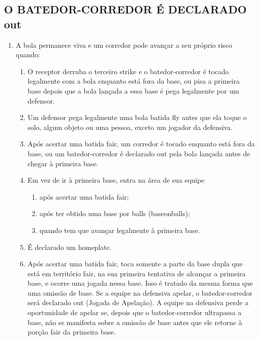 \vspace{5mm}
\subsection{O BATEDOR-CORREDOR \'E DECLARADO \gls{out}} 
\begin{multicols}{2}
	\begin{enumerate}[label=\alph*)]
		\item A bola permanece viva e um corredor pode avan\c{c}ar a seu pr\'oprio risco quando: 
		
		\begin{enumerate}[label=\roman*.]
			\item O receptor derruba o terceiro \gls{strike} e o batedor-corredor \'e tocado legalmente com a bola enquanto est\'a fora da base, ou pisa a primeira base 
			depois que a bola lan\c{c}ada a essa base \'e pega legalmente por um defensor. 
			\item Um defensor pega legalmente uma bola batida \gls{fly} antes que ela toque o solo, algum objeto ou uma pessoa, exceto um jogador da defensiva. 
			\item Ap\'os acertar uma batida \gls{fair}, um corredor \'e tocado enquanto est\'a fora da base, ou um batedor-corredor \'e declarado \gls{out} pela bola lan\c{c}ada antes de chegar \`a primeira base. 
			\item Em vez de ir \`a primeira base, entra na \'area de sua equipe 
			\begin{enumerate}[label=\arabic*)]
				\item ap\'os acertar uma batida \gls{fair}; 
				\item ap\'os ter obtido uma base por \glspl{ball} (\gls{baseonballs}); 
				\item quando tem que avan\c{c}ar legalmente \`a primeira base. 
			\end{enumerate}
			\item \'E declarado um \gls{homeplate}. 
			\item Ap\'os acertar uma batida \gls{fair}, toca somente a parte da base dupla que est\'a em territ\'orio \gls{fair}, na sua primeira tentativa de alcan\c{c}ar a primeira base, e ocorre uma jogada nessa base. Isso \'e tratado da mesma forma que uma omiss\~ao de base. Se a equipe na defensiva apelar, o batedor-corredor ser\'a declarado \gls{out} (Jogada de Apela\c{c}\~ao). A equipe na defensiva perde a oportunidade de apelar se, depois que o batedor-corredor ultrapassa a base, n\~ao se manifesta sobre a omiss\~ao de base antes que ele retorne \`a por\c{c}\~ao \gls{fair} da primeira base. 

\end{enumerate}
\end{enumerate}
\end{multicols}
